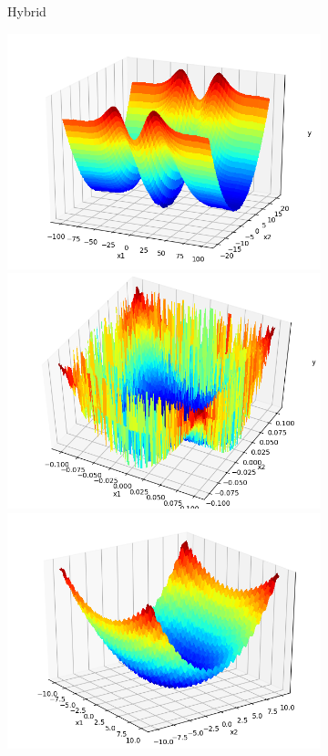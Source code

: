 \documentclass[a4paper,13pt,2p]{report}
\begin{document}
\begin{figure}[!ht]
\begin{subfigure}{0.24\textwidth}
  	 \caption{Hybrid}
  	\label{subfig:hybrid}
  	\end{subfigure}
  	\begin{subfigure}{0.24\textwidth}
  	 \includegraphics[width=1\linewidth]{png/functions/islo_compos_F26}
  	 \includegraphics[width=1\linewidth]{png/functions/islo_compos_F28}
  	 \includegraphics[width=1\linewidth]{png/functions/islo_compos_F29}

\end{subfigure}
\end{figure}
\end{document}
